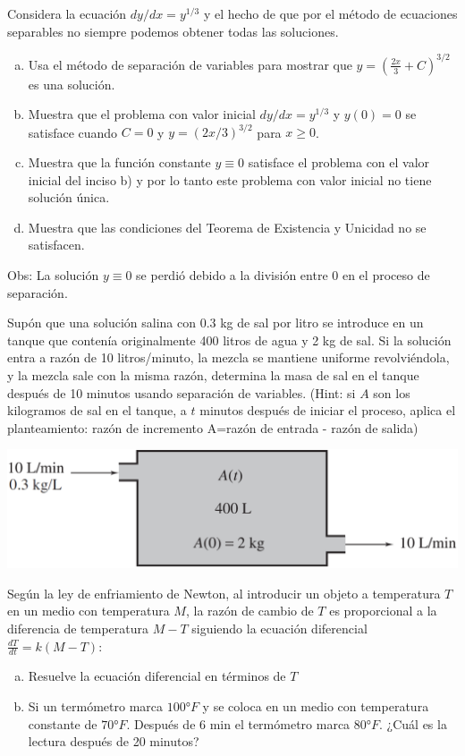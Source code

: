 \documentclass[12pt]{exam}
\begin{document}
\begin{questions}
     \question
     Considera la ecuación $dy/dx=y^{1/3}$ y el hecho de que por el método de ecuaciones separables no siempre podemos obtener todas las soluciones.
     \begin{enumerate}[a)]
     	\item	Usa el método de separación de variables para mostrar que $y=\left(\frac{2x}{3}+C\right)^{3/2}$ es una solución.
        \item	Muestra que el problema con valor inicial $dy/dx=y^{1/3}$ y $y(0)=0$ se satisface cuando $C=0$ y $y=(2x/3)^{3/2}$ para $x\geq0$.
        \item	Muestra que la función constante $y\equiv0$ satisface el problema con el valor inicial del inciso b) y por lo tanto este problema con valor inicial no tiene solución única.
         \item	Muestra que las condiciones del Teorema de Existencia y Unicidad no se satisfacen.
     \end{enumerate}
Obs: La solución $y\equiv0$ se perdió debido a la división entre 0 en el proceso de separación.

     \question
     Supón que una solución salina con 0.3 kg de sal por litro se introduce en un tanque que contenía originalmente 400 litros de agua y 2 kg de sal. Si la solución entra a razón de 10 litros/minuto, la mezcla se mantiene uniforme revolviéndola, y la mezcla sale con la misma razón, determina la masa de sal en el tanque después de 10 minutos usando separación de variables. (Hint: si $A$ son los kilogramos de sal en el tanque, a $t$ minutos después de iniciar el proceso, aplica el planteamiento: razón de incremento A=razón de entrada - razón de salida)
    
    \includegraphics[scale=.4]{F1T2.pdf}


     \question
     Según la ley de enfriamiento de Newton, al introducir un objeto a temperatura $T$ en un medio con temperatura $M$, la razón de cambio de $T$ es proporcional a la diferencia de temperatura $M-T$ siguiendo la ecuación diferencial $\frac{dT}{dt}=k(M-T)$:
     \begin{enumerate}[a)]
     \item	Resuelve la ecuación diferencial en términos de $T$
     \item	Si un termómetro marca $100°F$ y se coloca en un medio con temperatura constante de $70°F$.  Después de 6 min el termómetro marca $80°F$. ¿Cuál es la lectura después de 20 minutos?
     \end{enumerate}



\end{questions}
\end{document}
